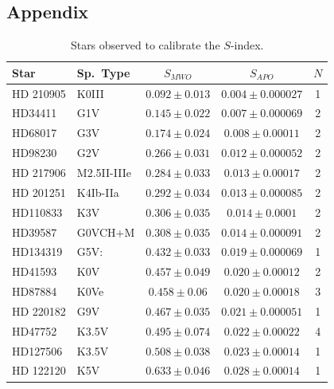 


\begin{subappendices}
\section*{Appendix}

\begin{longtable}{l l c c c} %
\caption{Stars observed to calibrate the $S$-index. \label{tab:cals}}
Star & Sp.~Type & $S_{MWO}$ & $S_{APO}$ & $N$ \\
\hline
HD 210905 & K0III & $0.092 \pm 0.013$ & $0.004 \pm 0.000027$ & 1 \\
HD34411 & G1V & $0.145 \pm 0.022$ & $0.007 \pm 0.000069$ & 2 \\
HD68017 & G3V & $0.174 \pm 0.024$ & $0.008 \pm 0.00011$ & 2 \\
HD98230 & G2V & $0.266 \pm 0.031$ & $0.012 \pm 0.000052$ & 2 \\
HD 217906 & M2.5II-IIIe & $0.284 \pm 0.033$ & $0.013 \pm 0.00017$ & 2 \\
HD 201251 & K4Ib-IIa & $0.292 \pm 0.034$ & $0.013 \pm 0.000085$ & 2 \\
HD110833 & K3V & $0.306 \pm 0.035$ & $0.014 \pm 0.0001$ & 2 \\
HD39587 & G0VCH+M & $0.308 \pm 0.035$ & $0.014 \pm 0.000091$ & 2 \\
HD134319 & G5V: & $0.432 \pm 0.033$ & $0.019 \pm 0.000069$ & 1 \\
HD41593 & K0V & $0.457 \pm 0.049$ & $0.020 \pm 0.00012$ & 2 \\
HD87884 & K0Ve & $0.458 \pm 0.06$ & $0.020 \pm 0.00018$ & 3 \\
HD 220182 & G9V & $0.467 \pm 0.035$ & $0.021 \pm 0.000051$ & 1 \\
HD47752 & K3.5V & $0.495 \pm 0.074$ & $0.022 \pm 0.00022$ & 4 \\
HD127506 & K3.5V & $0.508 \pm 0.038$ & $0.023 \pm 0.00014$ & 1 \\
HD 122120 & K5V & $0.633 \pm 0.046$ & $0.028 \pm 0.00014$ & 1 \\

\end{longtable}
\end{subappendices}
